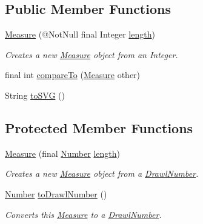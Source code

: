\subsection*{Public Member Functions}
\begin{DoxyCompactItemize}
\item 
\hyperlink{classcom_1_1aarrelaakso_1_1drawl_1_1_measure_a1960447b4b9dc0f4e71a2b86af31c52c}{Measure} (@Not\+Null final Integer \hyperlink{classcom_1_1aarrelaakso_1_1drawl_1_1_measure_aef040b9b0dd7d4a925448d0854c2444a}{length})
\begin{DoxyCompactList}\small\item\em Creates a new \hyperlink{classcom_1_1aarrelaakso_1_1drawl_1_1_measure}{Measure} object from an Integer. \end{DoxyCompactList}\item 
final int \hyperlink{classcom_1_1aarrelaakso_1_1drawl_1_1_measure_a02dc28edb78877bfc79eabe63ddde6f3}{compare\+To} (\hyperlink{classcom_1_1aarrelaakso_1_1drawl_1_1_measure}{Measure} other)
\item 
String \hyperlink{classcom_1_1aarrelaakso_1_1drawl_1_1_measure_a7b6b8ce14224c2b74aee35ef4516ee88}{to\+S\+VG} ()
\end{DoxyCompactItemize}
\subsection*{Protected Member Functions}
\begin{DoxyCompactItemize}
\item 
\hyperlink{classcom_1_1aarrelaakso_1_1drawl_1_1_measure_a8a609ce1111f169f66c3c787d640363d}{Measure} (final \hyperlink{interfacecom_1_1aarrelaakso_1_1drawl_1_1_number}{Number} \hyperlink{classcom_1_1aarrelaakso_1_1drawl_1_1_measure_aef040b9b0dd7d4a925448d0854c2444a}{length})
\begin{DoxyCompactList}\small\item\em Creates a new \hyperlink{classcom_1_1aarrelaakso_1_1drawl_1_1_measure}{Measure} object from a \hyperlink{classcom_1_1aarrelaakso_1_1drawl_1_1_drawl_number}{Drawl\+Number}. \end{DoxyCompactList}\item 
\hyperlink{interfacecom_1_1aarrelaakso_1_1drawl_1_1_number}{Number} \hyperlink{classcom_1_1aarrelaakso_1_1drawl_1_1_measure_a6f01cfe45e01d43e89a73eaa17e3649f}{to\+Drawl\+Number} ()
\begin{DoxyCompactList}\small\item\em Converts this \hyperlink{classcom_1_1aarrelaakso_1_1drawl_1_1_measure}{Measure} to a \hyperlink{classcom_1_1aarrelaakso_1_1drawl_1_1_drawl_number}{Drawl\+Number}. \end{DoxyCompactList}\end{DoxyCompactItemize}
